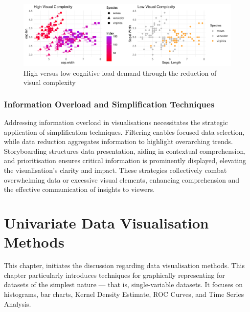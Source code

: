 \documentclass{article}\usepackage[]{graphicx}\usepackage[]{xcolor}
\makeatletter
\def\maxwidth{ %
  \ifdim\Gin@nat@width>\linewidth
    \linewidth
  \else
    \Gin@nat@width
  \fi
}
\newenvironment{knitrout}{}{} %
\numberwithin{equation}{section}
\makeatother
\begin{document}
\begin{knitrout}\scriptsize
{}\color{fgcolor}\begin{figure}[H]

{\centering \includegraphics[width=\maxwidth]{figure/beamer-cogload-plot-1} 

}

\caption[High versus low cognitive load demand through the reduction of visual complexity]{High versus low cognitive load demand through the reduction of visual complexity}\label{fig:cogload-plot}
\end{figure}

\end{knitrout}

\subsubsection{Information Overload and Simplification Techniques}
Addressing information overload in visualisations necessitates the strategic application of simplification techniques. Filtering enables focused data selection, while data reduction aggregates information to highlight overarching trends. Storyboarding structures data presentation, aiding in contextual comprehension, and prioritisation ensures critical information is prominently displayed, elevating the visualisation's clarity and impact. These strategies collectively combat overwhelming data or excessive visual elements, enhancing comprehension and the effective communication of insights to viewers.

\newpage

\section{Univariate Data Visualisation Methods}

This chapter, initiates the discussion regarding data visualisation methods. This chapter particularly introduces techniques for graphically representing for datasets of the simplest nature — that is, single-variable datasets. It focuses on histograms, bar charts, Kernel Density Estimate, ROC Curves, and Time Series Analysis. 
\end{document}
